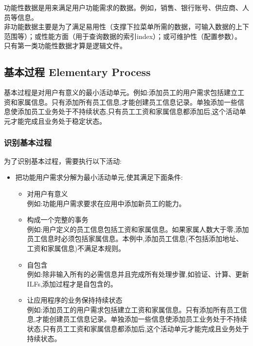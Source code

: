 功能性数据是用来满足用户功能需求的数据。例如，销售、银行账号、供应商、人员等信息。\\
非功能数据主要是为了满足易用性（支撑下拉菜单所需的数据，可输入数据的上下范围等）；或性能方面（用于查询数据的索引index）；或可维护性（配置参数）。\\
只有第一类功能性数据才算是逻辑文件。\\

\hypertarget{ux57faux672cux8fc7ux7a0b-elementary-process}{%
\subsection{基本过程 Elementary
Process}\label{ux57faux672cux8fc7ux7a0b-elementary-process}}

基本过程是对用户有意义的最小活动单元。例如:添加员工的用户需求包括建立工资和家属信息。只有添加所有员工信息,才能创建员工信息记录。单独添加一些信息使添加员工业务处于不持续状态,只有员工工资和家属信息都添加后,这个活动单元才能完成且业务处于稳定状态。

\hypertarget{ux8bc6ux522bux57faux672cux8fc7ux7a0b}{%
\subsubsection{识别基本过程}\label{ux8bc6ux522bux57faux672cux8fc7ux7a0b}}

为了识别基本过程，需要执行以下活动:

\begin{itemize}
\tightlist
\item
  把功能用户需求分解为最小活动单元,使其满足下面条件:

  \begin{itemize}
  \tightlist
  \item
    对用户有意义\\
    例如:功能用户需求要求在应用中添加新员工的能力。\\
  \item
    构成一个完整的事务\\
    例如:用户定义的员工信息包括工资和家属信息。如果家属人数大于零,添加员工信息时必须包括家属信息。本例中,添加员工信息(不包括添加地址、工资和家属信息)不满足本规则。\\
  \item
    自包含\\
    例如:除非输入所有的必需信息并且完成所有处理步骤,如验证、计算、更新ILFs,添加过程才是自包含的。\\
  \item
    让应用程序的业务保持持续状态\\
    例如:添加员工的用户需求包括建立工资和家属信息。只有添加所有员工信息,才能创建员工信息记录。单独添加一些信息使添加员工业务处于不持续状态,只有员工工资和家属信息都添加后,这个活动单元才能完成且业务处于持续状态。\\
  \end{itemize}
\end{itemize}

